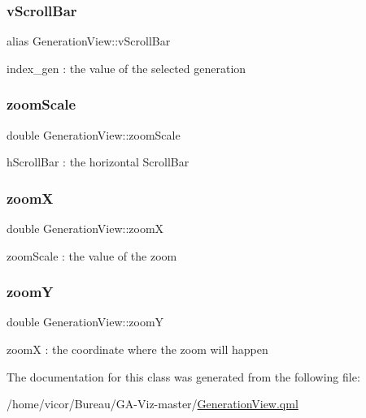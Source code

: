 \subsubsection{\texorpdfstring{v\+Scroll\+Bar}{vScrollBar}}
{\footnotesize\ttfamily alias Generation\+View\+::v\+Scroll\+Bar}

index\+\_\+gen \+: the value of the selected generation \mbox{\label{class_generation_view_ad57ffa675b53681b9671f7a61286d426}} 
\subsubsection{\texorpdfstring{zoom\+Scale}{zoomScale}}
{\footnotesize\ttfamily double Generation\+View\+::zoom\+Scale}

h\+Scroll\+Bar \+: the horizontal Scroll\+Bar \mbox{\label{class_generation_view_a3d67ca1114e1b862aed9cf857bb7aa10}} 
\subsubsection{\texorpdfstring{zoomX}{zoomX}}
{\footnotesize\ttfamily double Generation\+View\+::zoomX}

zoom\+Scale \+: the value of the zoom \mbox{\label{class_generation_view_aadd82b9a0aa525d054082aaa4c04c4a9}} 
\subsubsection{\texorpdfstring{zoomY}{zoomY}}
{\footnotesize\ttfamily double Generation\+View\+::zoomY}

zoomX \+: the coordinate where the zoom will happen 

The documentation for this class was generated from the following file\+:\begin{DoxyCompactItemize}
\item 
/home/vicor/\+Bureau/\+G\+A-\/\+Viz-\/master/\hyperlink{_generation_view_8qml}{Generation\+View.\+qml}\end{DoxyCompactItemize}
